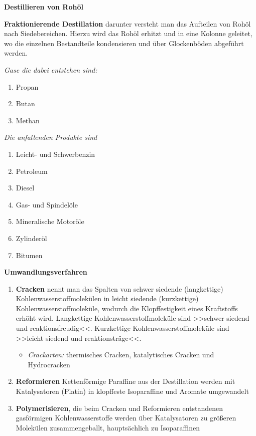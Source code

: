 \textbf{Destillieren von Rohöl}

\textbf{Fraktionierende Destillation} darunter versteht man das
Aufteilen von Rohöl nach Siedebereichen. Hierzu wird das Rohöl erhitzt
und in eine Kolonne geleitet, wo die einzelnen Bestandteile kondensieren
und über Glockenböden abgeführt werden.

\emph{Gase die dabei entstehen sind:}

\begin{enumerate}
\item
  Propan
\item
  Butan
\item
  Methan
\end{enumerate}

\emph{Die anfallenden Produkte sind}

\begin{enumerate}
\item
  Leicht- und Schwerbenzin
\item
  Petroleum
\item
  Diesel
\item
  Gas- und Spindelöle
\item
  Mineralische Motoröle
\item
  Zylinderöl
\item
  Bitumen
\end{enumerate}

\textbf{Umwandlungsverfahren}

\begin{enumerate}
\item
  \textbf{Cracken} nennt man das Spalten von schwer siedende
  (langkettige) Kohlenwasserstoffmolekülen in leicht siedende
  (kurzkettige) Kohlenwasserstoffmoleküle, wodurch die Klopffestigkeit
  eines Kraftstoffs erhöht wird. Langkettige Kohlenwasserstoffmoleküle
  sind >>schwer siedend und reaktionsfreudig<<. Kurzkettige
  Kohlenwasserstoffmoleküle sind >>leicht siedend und reaktionsträge<<.

  \begin{itemize}
  \item
    \emph{Crackarten:} thermisches Cracken, katalytisches Cracken und
    Hydrocracken
  \end{itemize}
\item
  \textbf{Reformieren} Kettenförmige Paraffine aus der Destillation
  werden mit Katalysatoren (Platin) in klopffeste Isoparaffine und
  Aromate umgewandelt
\item
  \textbf{Polymerisieren}, die beim Cracken und Reformieren entstandenen
  gasförmigen Kohlenwasserstoffe werden über Katalysatoren zu größeren
  Molekülen zusammengeballt, hauptsächlich zu Isoparaffinen
\end{enumerate}

